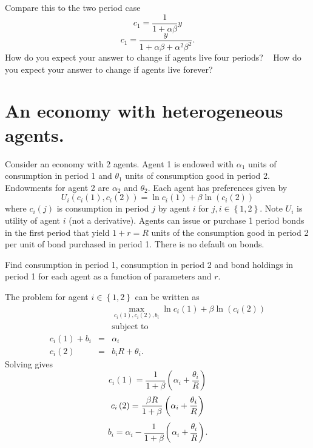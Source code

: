 \documentclass{sebase}
\begin{document}
Compare this to the two period case%
\begin{equation*}
c_{1}=\frac{1}{1+\alpha \beta }y
\end{equation*}%
\begin{equation*}
c_{1}=\frac{y}{1+\alpha \beta +\alpha ^{2}\beta ^{2}}.
\end{equation*}%
How do you expect your answer to change if agents live four periods? \ 
\newline
How do you expect your answer to change if agents live forever?

\pagebreak

\section{An economy with heterogeneous agents.}

Consider an economy with 2 agents. Agent 1 is endowed with $\alpha _{1}$
units of consumption in period 1 and $\theta _{1}$ units of consumption good
in period 2. Endowments for agent 2 are $\alpha _{2}$ and $\theta _{2}.$
Each agent has preferences given by 
\begin{equation*}
U_{i}\left( c_{i}\left( 1\right) ,c_{i}\left( 2\right) \right) =\ln
c_{i}\left( 1\right) +\beta \ln \left( c_{i}\left( 2\right) \right)
\end{equation*}%
where $c_{i}\left( j\right) $ is consumption in period $j$ by agent $i$ for $%
j,i\in \left\{ 1,2\right\} .$ Note $U_{i}$ is utility of agent $i$ (not a
derivative). Agents can issue or purchase 1 period bonds in the first period
that yield $1+r=R$ units of the consumption good in period 2 per unit of
bond purchased in period 1. There is no default on bonds.

Find consumption in period 1, consumption in period 2 and bond holdings in
period 1 for each agent as a function of parameters and $r.$\newline
\pagebreak

The problem for agent $i\in \left\{ 1,2\right\} $ can be written as%
\begin{eqnarray*}
&&\underset{c_{i}\left( 1\right) ,c_{i}\left( 2\right) ,b_{i}}{\max }\ln
c_{i}\left( 1\right) +\beta \ln \left( c_{i}\left( 2\right) \right) \\
&&\text{subject to} \\
c_{i}\left( 1\right) +b_{i} &=&\alpha _{i} \\
c_{i}\left( 2\right) &=&b_{i}R+\theta _{i}.
\end{eqnarray*}%
Solving gives 
\begin{equation*}
c_{i}\left( 1\right) =\frac{1}{1+\beta }\left( \alpha _{i}+\frac{\theta _{i}%
}{R}\right)
\end{equation*}%
\begin{equation*}
c_{i}\left( 2\right) =\frac{\beta R}{1+\beta }\left( \alpha _{i}+\frac{%
\theta _{i}}{R}\right)
\end{equation*}%
\begin{equation}
b_{i}=\alpha _{i}-\frac{1}{1+\beta }\left( \alpha _{i}+\frac{\theta _{i}}{R}%
\right) .  \label{bond}
\end{equation}
\end{document}
